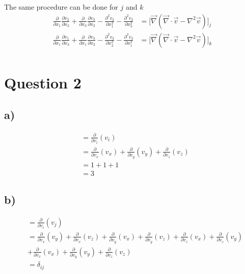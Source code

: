 \documentclass[paper=a4, fontsize=12pt]{scrartcl}
\begin{document}
The same procedure can be done for $j$ and $k$ 
\begin{align*}
\frac{\partial}{\partial x_1}\frac{\partial v_2}{\partial x_2} 
+ \frac{\partial}{\partial x_3}\frac{\partial v_3}{\partial x_2} 
- \frac{\partial ^2 v_2}{\partial x_1^2} 
-\frac{\partial^2 v_2}{\partial x_3^2} 
&= \big[\vec{\nabla}(\vec{\nabla} \cdot \vec{v} - \nabla^2 \vec{v})\big]_j\\
\frac{\partial}{\partial x_1}\frac{\partial v_1}{\partial x_3} 
+ \frac{\partial}{\partial x_1}\frac{\partial v_3}{\partial x_2} 
- \frac{\partial ^2 v_3}{\partial x_2^2} 
-\frac{\partial^2 v_3}{\partial x_1^2} 
&= \big[\vec{\nabla}(\vec{\nabla} \cdot \vec{v} - \nabla^2 \vec{v})\big]_k\\
\end{align*}


\section*{Question 2}
\subsection*{a)}
\begin{align*}
&=\frac{\partial}{\partial v_i}(v_i)\\
&= 
	\frac{\partial}{\partial v_x}(v_x) 
	+ \frac{\partial}{\partial v_y}(v_y)    
	+ \frac{\partial}{\partial v_z}(v_z)\\
& = 
	1 
	+ 1
	+ 1\\
& = 3	
\end{align*}	
\subsection*{b)}
\begin{align*}
&=\frac{\partial}{\partial v_i}(v_j)\\
&= 
\frac{\partial}{\partial v_x}(v_y) 
+ \frac{\partial}{\partial v_x}(v_z)    
+ \frac{\partial}{\partial v_y}(v_x)
+ \frac{\partial}{\partial v_y}(v_z)
+ \frac{\partial}{\partial v_z}(v_x)
+ \frac{\partial}{\partial v_z}(v_y)\\
&+ \frac{\partial}{\partial v_x} (v_x) 
+ \frac{\partial}{\partial v_y} (v_y) 
+ \frac{\partial}{\partial v_z} (v_z) 
\\
&= \delta _{ij}
\end{align*}
\end{document}
